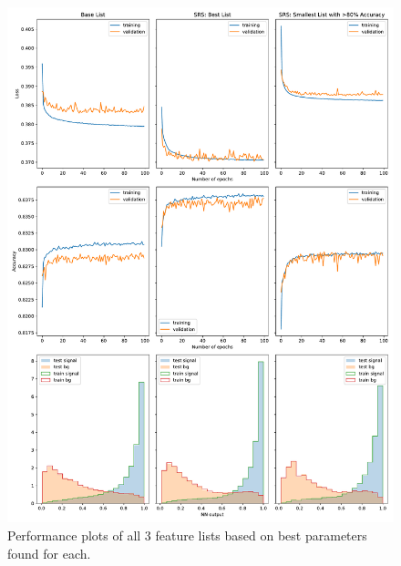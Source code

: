 \documentclass[]{article}
\begin{document}
\begin{figure}[ht]
	\centering
	\includegraphics[width=\linewidth]{best_model/best_models.pdf}
	\caption{Performance plots of all 3 feature lists based on best parameters found for each.}
	\label{fig:best_models}
\end{figure}
\end{document}
